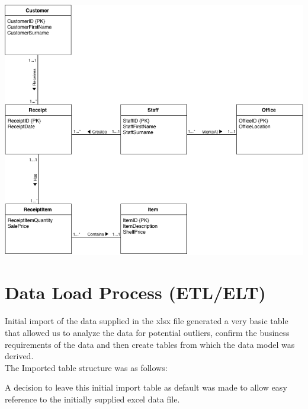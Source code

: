 \documentclass{article}
\begin{document}
	\vspace{10mm}    
    
    \begin{center}
        \includegraphics[width=\textwidth-40pt,keepaspectratio]{Images/A2-EERModel.png}
    \end{center}




    \newpage
    \section{Data Load Process (ETL/ELT)}
        Initial import of the data supplied in the xlsx file generated a very basic table
        that allowed us to analyze the data for potential outliers, confirm the business
        requirements of the data and then create tables from which the data model was derived.
        \\
        The Imported table structure was as follows:
        \begin{center}
        \end{center}

        \noindent
        A decision to leave this initial import table as default
        was made to allow easy reference to the initially supplied
        excel data file.
\end{document}
